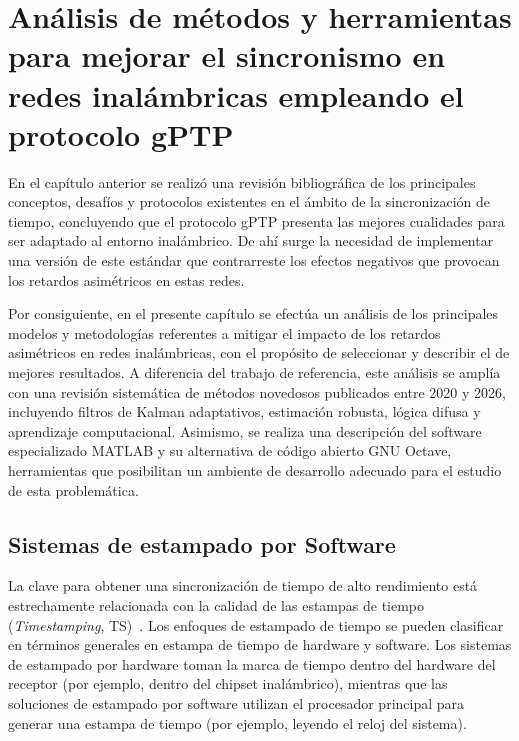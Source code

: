 
\chapter{Análisis de métodos y herramientas para mejorar el sincronismo en redes inalámbricas empleando el protocolo gPTP}
\label{ch:capitulo2}

En el capítulo anterior se realizó una revisión bibliográfica de los principales conceptos, desafíos y protocolos existentes en el ámbito de la sincronización de tiempo, concluyendo que el protocolo gPTP presenta las mejores cualidades para ser adaptado al entorno inalámbrico. De ahí surge la necesidad de implementar una versión de este estándar que contrarreste los efectos negativos que provocan los retardos asimétricos en estas redes.

Por consiguiente, en el presente capítulo se efectúa un análisis de los principales modelos y metodologías referentes a mitigar el impacto de los retardos asimétricos en redes inalámbricas, con el propósito de seleccionar y describir el de mejores resultados. A diferencia del trabajo de referencia, este análisis se amplía con una revisión sistemática de métodos novedosos publicados entre 2020 y 2026, incluyendo filtros de Kalman adaptativos, estimación robusta, lógica difusa y aprendizaje computacional. Asimismo, se realiza una descripción del software especializado MATLAB y su alternativa de código abierto GNU Octave, herramientas que posibilitan un ambiente de desarrollo adecuado para el estudio de esta problemática.

\section{Sistemas de estampado por Software}
\label{sec:2.1}

La clave para obtener una sincronización de tiempo de alto rendimiento está estrechamente relacionada con la calidad de las estampas de tiempo (\textit{Timestamping}, TS)~\cite{seijo2020,ferrari2014}. Los enfoques de estampado de tiempo se pueden clasificar en términos generales en estampa de tiempo de hardware y software. Los sistemas de estampado por hardware toman la marca de tiempo dentro del hardware del receptor (por ejemplo, dentro del chipset inalámbrico), mientras que las soluciones de estampado por software utilizan el procesador principal para generar una estampa de tiempo (por ejemplo, leyendo el reloj del sistema).

